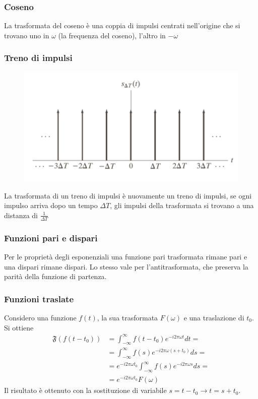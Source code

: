 \subsubsection{Coseno}
La trasformata del coseno è una coppia di impulsi centrati nell'origine che si trovano uno in $\omega$ (la frequenza del coseno), l'altro in $-\omega$

\subsubsection{Treno di impulsi}
\begin{figure}
	\vspace{-.7cm}
	\centering
	\includegraphics[width=.9\linewidth]{Picture/Impulse_Train}
\end{figure}
La trasformata di un treno di impulsi è nuovamente un treno di impulsi, se ogni impulso arriva dopo un tempo $\Delta T$, gli impulsi della trasformata si trovano a una distanza di $\frac{1}{\Delta T}$

\subsubsection{Funzioni pari e dispari}
Per le proprietà degli esponenziali una funzione pari trasformata rimane pari e una dispari rimane dispari. Lo stesso vale per l'antitrasformata, che preserva la parità della funzione di partenza.

\subsubsection{Funzioni traslate}
Considero una funzione $f(t)$, la sua trasformata $F(\omega)$ e una traslazione di $t_0$.  Si ottiene
\begin{equation}
	\begin{split}
		\mathfrak{F}(f(t-t_0)) &= \int_{-\infty}^{\infty} f(t - t_0)  e^{-i2\pi\omega t} dt = \\
		&=\int_{-\infty}^{\infty} f(s)  e^{-i2\pi\omega (s + t_0)} ds =\\
		& =e^{-i2\pi\omega t_0} \int_{-\infty}^{\infty} f(s)  e^{-i2\pi\omega s} ds =\\
		&=e^{-i2\pi\omega t_0}F(\omega)
	\end{split}
\end{equation} 
Il risultato è  ottenuto con la sostituzione di variabile $s = t - t_0 \rightarrow t = s + t_0$.

